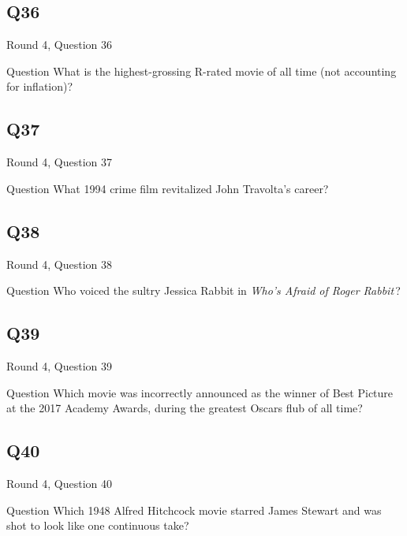 \documentclass[11pt]{beamer}
\begin{document}
\subsection*{Q36}
\begin{frame}[t]{Round 4, Question 36}
  \vspace{2em}
  \begin{block}{Question}
    What is the highest-grossing R-rated movie of all time (not accounting for inflation)?
  \end{block}
\end{frame}


\subsection*{Q37}
\begin{frame}[t]{Round 4, Question 37}
  \vspace{2em}
  \begin{block}{Question}
    What 1994 crime film revitalized John Travolta's career?
  \end{block}
\end{frame}


\subsection*{Q38}
\begin{frame}[t]{Round 4, Question 38}
  \vspace{2em}
  \begin{block}{Question}
    Who voiced the sultry Jessica Rabbit in \emph{Who's Afraid of Roger Rabbit}\,?
  \end{block}
\end{frame}


\subsection*{Q39}
\begin{frame}[t]{Round 4, Question 39}
  \vspace{2em}
  \begin{block}{Question}
    Which movie was incorrectly announced as the winner of Best Picture at the 2017 Academy Awards, during the greatest Oscars flub of all time?
  \end{block}
\end{frame}


\subsection*{Q40}
\begin{frame}[t]{Round 4, Question 40}
  \vspace{2em}
  \begin{block}{Question}
    Which 1948 Alfred Hitchcock movie starred James Stewart and was shot to look like one continuous take?
  \end{block}
\end{frame}
\end{document}

